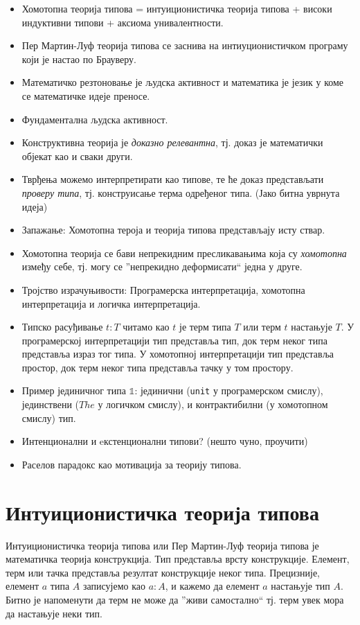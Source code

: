 \documentclass[12pt,oneside]{memoir}
\begin{document}
\begin{itemize}
    \item{Хомотопна теорија типова = интуиционистичка теорија типова + високи индуктивни типови + аксиома унивалентности.}
    \item{Пер Мартин-Луф теорија типова се заснива на интиуционистичком програму који је настао по Брауверу.}
    \item{Математичко резтоновање је људска активност и математика је језик у коме се математичке идеје преносе.}
    \item{Фундаментална људска активност.}
    \item{Конструктивна теорија је \textit{доказно релевантна}, тј. доказ је математички објекат као и сваки други.}
    \item{Тврђења можемо интерпретирати као типове, те ће доказ представљати \textit{проверу типа}, тј. конструисање терма одређеног типа. (Јако битна уврнута идеја)}
    \item{Запажање: Хомотопна тероја и теорија типова представљају исту ствар.}
    \item{Хомотопна теорија се бави непрекидним пресликавањима која су \textit{хомотопна} између себе, тј. могу се ''непрекидно деформисати`` једна у друге.}
    \item{Тројство израчуњивости: Програмерска интерпретација, хомотопна интерпретација и логичка интерпретација.}
    \item{Типско расуђивање $t : T$ читамо као $t$ је терм типа $T$ или терм $t$ настањује $T$. У програмерској интерпретацији тип представља тип, док терм неког типа представља израз тог типа. У хомотопној интерпретацији тип представља простор, док терм неког типа представља тачку у том простору.}
    \item{Пример јединичног типа $\mathbb{1}$: јединични (\texttt{unit} у програмерском смислу), јединствени ($The$ у логичком смислу), и контрактибилни (у хомотопном смислу) тип.}
    \item{Интенционални и eкстенционални типови? (нешто чуно, проучити)}
    \item{Раселов парадокс као мотивација за теорију типова.}
\end{itemize}

\chapter{Интуиционистичка теорија типова}

Интуиционистичка теорија типова или Пер Мартин-Луф теорија типова је математичка теорија конструкција. Тип представља врсту конструкције. Елемент, терм или тачка представља резултат конструкције неког типа. Прецизније, елемент $a$ типа $A$ записујемо као $a : A$, и кажемо да елемент $a$ настањује тип $A$. Битно је напоменути да терм не може да ''живи самостално`` тј. терм увек мора да настањује неки тип. 
\end{document}
